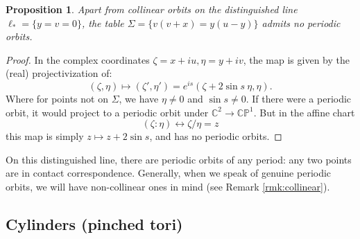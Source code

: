 \documentclass{article}
\newtheorem{prop}{Proposition}[section]
\begin{document}
\begin{prop}
   Apart from collinear orbits on the distinguished line $\ell_*=\{ y =v=0 \}$, the table $\Sigma = \{ v(v+x)=y(u-y)\}$ admits no periodic orbits.
\end{prop}
\begin{proof}
    In the complex coordinates $\zeta =x + iu, \eta= y+iv$, the map is given by the (real) projectivization of:
    \[ (\zeta,\eta)\mapsto  (\zeta',\eta') = e^{is}(\zeta +2\sin s~\eta, \eta).\]
    Where for points not on $\Sigma$, we have $\eta\ne 0$ and $\sin s\ne 0$. If there were a periodic orbit, it would project to a periodic orbit under $\mathbb{C}^2\to \mathbb{CP}^1$. But in the affine chart
    \[(\zeta:\eta)\longleftrightarrow \zeta/\eta = z \]
    this map is simply $z\mapsto z +2\sin s$, and has no periodic orbits.
\end{proof}

On this distinguished line, there are periodic orbits of any period: any two points are in contact correspondence. Generally, when we speak of genuine periodic orbits, we will have non-collinear ones in mind (see Remark \ref{rmk:collinear}).





\subsection{Cylinders (pinched tori)}\label{sec:Cyl}
\end{document}
